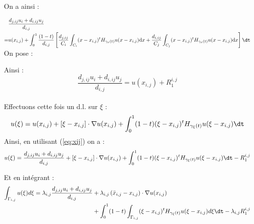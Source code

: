 \documentclass[12pt,a4paper]{article}
\begin{document}
	On a ainsi : 
	
	\vspace{.2cm}
	
	$\begin{aligned}
		&\dfrac{d_{j,ij}u_i + d_{i,ij}u_j}{d_{i,j}}\\
		= & u(  x_{i,j}) + \displaystyle\int_0^1 \dfrac{(1-t)}{d_{i,j}}\left[\dfrac{d_{j,ij}}{C_i}\int_{C_i}( {x-x_{i,j}})^tH_{\gamma_{x}(t)}u ( {x-x_{i,j}})\mathrm d  x + \dfrac{d_{i,ij}}{C_j}\int_{C_j}( {x-x_{i,j}})^tH_{\gamma_{x}(t)}u ( {x-x_{i,j}})\mathrm d  x\right] \dt
	\end{aligned}$\\
	
	On pose :
	
	\hspace*{-.5cm}
	
	
	Ainsi : \\
	\begin{equation}\label{eq:xij}
		\dfrac{d_{j,ij}u_i + d_{i,ij}u_j}{d_{i,j}} = u(  x_{i,j}) + R_1^{i,j}
	\end{equation}\\
	
	Effectuons cette fois un d.l. sur $ \xi$ : 	
	\[
	u( \xi) = u(  x_{i,j}) + \left[ \xi-  x_{i,j}\right]\cdot {\nabla u}(  x_{i,j}) + \displaystyle\int_0^1 (1-t)( \xi-  x_{i,j})^tH_{\gamma_{ \xi}(t)}u ( \xi-  x_{i,j}) \dt
	\]
	Ainsi, en utilisant (\ref{eq:xij}) on a :	
	\[u( \xi) = \dfrac{d_{j,ij}u_i + d_{i,ij}u_j}{d_{i,j}} + \left[ \xi-  x_{i,j}\right]\cdot {\nabla u}(  x_{i,j}) + \displaystyle\int_0^1 (1-t)( \xi-  x_{i,j})^tH_{\gamma_{ \xi}(t)}u ( \xi-  x_{i,j}) \dt - R_1^{i,j}\]
	
	Et en intégrant : 
	\[\begin{aligned}
		\displaystyle\int_{\Gamma_{i,j}} u( \xi)d \xi = \lambda_{i,j}\dfrac{d_{j,ij}u_i + d_{i,ij}u_j}{d_{i,j}} &+ \lambda_{i,j}\left( {\bar x_{i,j}-  x_{i,j}}\right)\cdot {\nabla u}(  x_{i,j}) \\
		&+ \displaystyle\int_0^1 (1-t)\int_{\Gamma_{i,j}} ( \xi-x_{i,j})^tH_{\gamma_{ \xi}(t)}u ( \xi-  x_{i,j})d \xi \dt - \lambda_{i,j}R_1^{i,j}
	\end{aligned}\]
	
\end{document}
